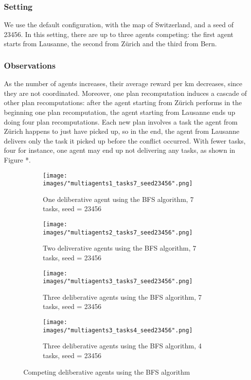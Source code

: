 \documentclass[10pt]{article}
\begin{document}
\subsubsection{Setting}
We use the default configuration, with the map of Switzerland, and a seed of 23456. In this setting, there are up to three agents competing: the first agent starts from Lausanne, the second from Zürich and the third from Bern.

\subsubsection{Observations}
As the number of agents increases, their average reward per km decreases, since they are not coordinated.
Moreover, one plan recomputation induces a cascade of other plan recomputations: after the agent starting from Zürich performs in the beginning one plan recomputation, the agent starting from Lausanne ends up doing four plan recomputations. Each new plan involves a task the agent from Zürich happens to just have picked up, so in the end, the agent from Lausanne delivers only the task it picked up before the conflict occurred.
With fewer tasks, four for instance, one agent may end up not delivering any tasks, as shown in Figure *.


\begin{figure}[h!]
\centering
\begin{subfigure}[t]{0.24\textwidth}
\captionsetup{width=1.0\textwidth}
\texttt{[image: images/"multiagents1\_tasks7\_seed23456".png]}
\caption{One deliberative agent using the BFS algorithm, 7 tasks, seed = 23456}
\end{subfigure}
\hfill
\begin{subfigure}[t]{0.24\textwidth}
\captionsetup{width=1.0\textwidth}
\texttt{[image: images/"multiagents2\_tasks7\_seed23456".png]}
\caption{Two deliverative agents using the BFS algorithm, 7 tasks, seed = 23456}
\end{subfigure}
\hfill
\begin{subfigure}[t]{0.24\textwidth}
\captionsetup{width=1.0\textwidth}
\texttt{[image: images/"multiagents3\_tasks7\_seed23456".png]}
\caption{Three deliberative agents using the BFS algorithm, 7 tasks, seed = 23456}
\end{subfigure}
\hfill
\begin{subfigure}[t]{0.24\textwidth}
\captionsetup{width=1.0\textwidth}
\texttt{[image: images/"multiagents3\_tasks4\_seed23456".png]}
\caption{Three deliberative agents using the BFS algorithm, 4 tasks, seed = 23456}
\end{subfigure}
\caption{Competing deliberative agents using the BFS algorithm}
\label{discount factor}
\end{figure}
\end{document}
